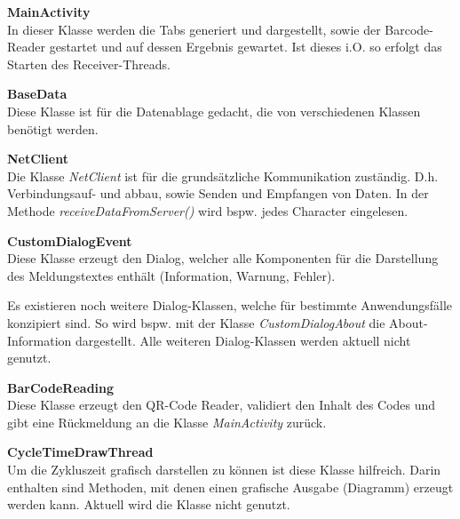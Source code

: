 \textbf{MainActivity}\\
In dieser Klasse werden die Tabs generiert und dargestellt, sowie der 
Barcode-Reader gestartet und auf dessen Ergebnis gewartet. Ist dieses i.O. so 
erfolgt das Starten des Receiver-Threads.

\textbf{BaseData}\\
Diese Klasse ist für die Datenablage gedacht, die von verschiedenen Klassen  
benötigt werden.

\textbf{NetClient}\\
Die Klasse \textit{NetClient} ist für die grundsätzliche Kommunikation 
zuständig. D.h. Verbindungsauf- und abbau, sowie Senden und Empfangen von 
Daten. In der Methode \textit{receiveDataFromServer()} wird bspw. jedes 
Character eingelesen.

\textbf{CustomDialogEvent}\\
Diese Klasse erzeugt den Dialog, welcher alle Komponenten für die Darstellung 
des Meldungstextes enthält (Information, Warnung, Fehler).

Es existieren noch weitere Dialog-Klassen, welche für bestimmte Anwendungsfälle 
konzipiert sind. So wird bspw. mit der Klasse \textit{CustomDialogAbout} die 
About-Information dargestellt. Alle weiteren Dialog-Klassen werden aktuell 
nicht genutzt.

\textbf{BarCodeReading}\\
Diese Klasse erzeugt den QR-Code Reader, validiert den Inhalt des Codes und 
gibt eine Rückmeldung an die Klasse \textit{MainActivity} zurück.

\textbf{CycleTimeDrawThread}\\
Um die Zykluszeit grafisch darstellen zu können ist diese Klasse hilfreich. 
Darin enthalten sind Methoden, mit denen einen grafische Ausgabe (Diagramm) 
erzeugt werden kann. Aktuell wird die Klasse nicht genutzt.

